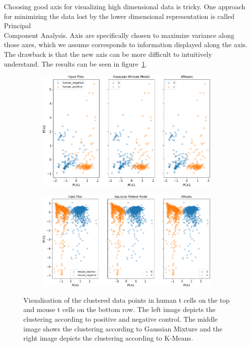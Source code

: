 Choosing good axis for visualizing high dimensional data is tricky. One approach for minimizing the data lost by the lower dimensional representation is called Principal\\ Component Analysis. Axis are specifically chosen to maximize variance along those axes, which we assume corresponds to information displayed along the axis. The drawback is that the new axis can be more difficult to intuitively understand. The results can be seen in figure~\ref{fig:vis_output_seperate}.
	
\begin{figure}
	\centering
	\begin{subfigure}{\linewidth}
		\includegraphics[width=\textwidth]{fig/separate_human}
	\end{subfigure}
	\hfill
	\vspace{0.5cm}
	\begin{subfigure}{\linewidth}
		\includegraphics[width=\textwidth]{fig/separate_mouse}
	\end{subfigure}
	
	\caption{Visualisation of the clustered data points in human t cells on the top and mouse t cells on the bottom row. The left image depicts the clustering according to positive and negative control. The middle image shows the clustering according to Gaussian Mixture and the right image depicts the clustering according to K-Means.}
	\label{fig:vis_output_seperate}
\end{figure}

